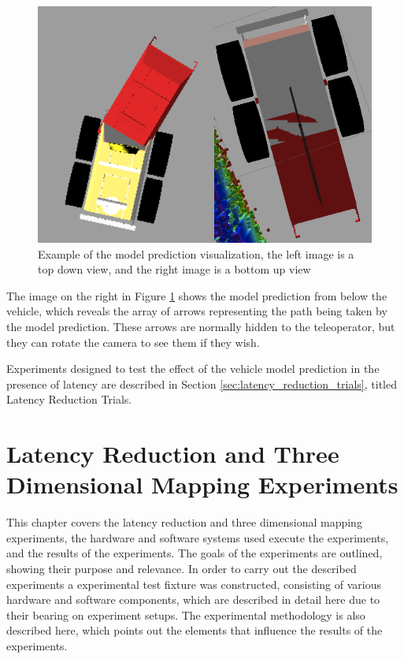 \documentclass[12pt]{report}
\begin{document}
\begin{figure}[ht]
  \centering
  \includegraphics[width=5in,keepaspectratio]{latency_ss.png}
  \caption{Example of the model prediction visualization, the left image is a top down view, and the right image is a bottom up view}
  \label{fig:latency_ss}
\end{figure}

The image on the right in Figure \ref{fig:latency_ss} shows the model prediction from below the vehicle, which reveals the array of arrows representing the path being taken by the model prediction.  These arrows are normally hidden to the teleoperator, but they can rotate the camera to see them if they wish.

Experiments designed to test the effect of the vehicle model prediction in the presence of latency are described in Section \ref{sec:latency_reduction_trials}, titled Latency Reduction Trials.


\chapter{Latency Reduction and Three Dimensional Mapping Experiments}\label{chap:experiments}
This chapter covers the latency reduction and three dimensional mapping experiments, the hardware and software systems used execute the experiments, and the results of the experiments.  The goals of the experiments are outlined, showing their purpose and relevance.  In order to carry out the described experiments a experimental test fixture was constructed, consisting of various hardware and software components, which are described in detail here due to their bearing on experiment setups.  The experimental methodology is also described here, which points out the elements that influence the results of the experiments.
\end{document}
